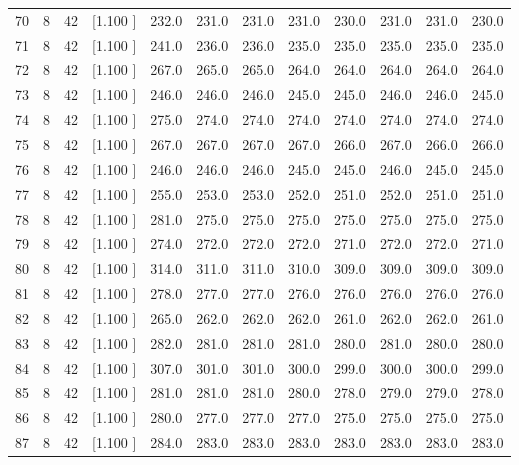 \documentclass[12pt,a4paper]{article}
\begin{document}
\begin{center}
{\begin{tabular}{r r r r r r r r r r r r}
  70&  8& 42&[1.100     ]&   232.0&   231.0&   231.0&   231.0&   230.0&   231.0&   231.0&   230.0\\[-0.02in]
  71&  8& 42&[1.100     ]&   241.0&   236.0&   236.0&   235.0&   235.0&   235.0&   235.0&   235.0\\[-0.02in]
  72&  8& 42&[1.100     ]&   267.0&   265.0&   265.0&   264.0&   264.0&   264.0&   264.0&   264.0\\[-0.02in]
  73&  8& 42&[1.100     ]&   246.0&   246.0&   246.0&   245.0&   245.0&   246.0&   246.0&   245.0\\[-0.02in]
  74&  8& 42&[1.100     ]&   275.0&   274.0&   274.0&   274.0&   274.0&   274.0&   274.0&   274.0\\[-0.02in]
  75&  8& 42&[1.100     ]&   267.0&   267.0&   267.0&   267.0&   266.0&   267.0&   266.0&   266.0\\[-0.02in]
  76&  8& 42&[1.100     ]&   246.0&   246.0&   246.0&   245.0&   245.0&   246.0&   245.0&   245.0\\[-0.02in]
  77&  8& 42&[1.100     ]&   255.0&   253.0&   253.0&   252.0&   251.0&   252.0&   251.0&   251.0\\[-0.02in]
  78&  8& 42&[1.100     ]&   281.0&   275.0&   275.0&   275.0&   275.0&   275.0&   275.0&   275.0\\[-0.02in]
  79&  8& 42&[1.100     ]&   274.0&   272.0&   272.0&   272.0&   271.0&   272.0&   272.0&   271.0\\[-0.02in]
  80&  8& 42&[1.100     ]&   314.0&   311.0&   311.0&   310.0&   309.0&   309.0&   309.0&   309.0\\[-0.02in]
  81&  8& 42&[1.100     ]&   278.0&   277.0&   277.0&   276.0&   276.0&   276.0&   276.0&   276.0\\[-0.02in]
  82&  8& 42&[1.100     ]&   265.0&   262.0&   262.0&   262.0&   261.0&   262.0&   262.0&   261.0\\[-0.02in]
  83&  8& 42&[1.100     ]&   282.0&   281.0&   281.0&   281.0&   280.0&   281.0&   280.0&   280.0\\[-0.02in]
  84&  8& 42&[1.100     ]&   307.0&   301.0&   301.0&   300.0&   299.0&   300.0&   300.0&   299.0\\[-0.02in]
  85&  8& 42&[1.100     ]&   281.0&   281.0&   281.0&   280.0&   278.0&   279.0&   279.0&   278.0\\[-0.02in]
  86&  8& 42&[1.100     ]&   280.0&   277.0&   277.0&   277.0&   275.0&   275.0&   275.0&   275.0\\[-0.02in]
  87&  8& 42&[1.100     ]&   284.0&   283.0&   283.0&   283.0&   283.0&   283.0&   283.0&   283.0\\[-0.02in]

\end{tabular}}
\end{center}
\end{document}
